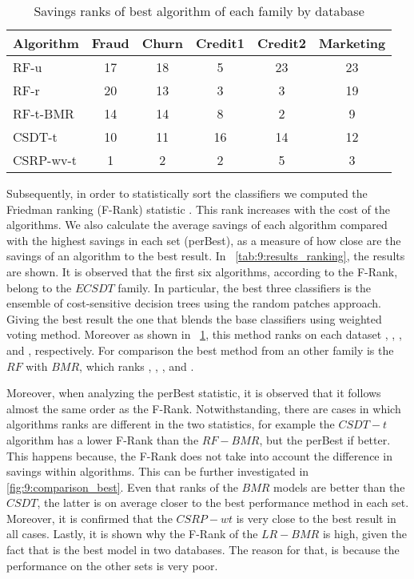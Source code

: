 {\begin{table}[!t]
  \end{table}
  \begin{table}[t]
    \centering
    \footnotesize
    \begin{tabular}{l c c c c c  } %
      \hline
      \bf{Algorithm} & \bf{Fraud} & \bf{Churn} &\bf{Credit1} & \bf{Credit2} & \bf{Marketing} \\
      \hline
      RF-u&17&18&5&23&23\\ 
      RF-r&20&13&3&3&19\\ 
      RF-t-BMR&14&14&8&2&9\\ 
      CSDT-t&10&11&16&14&12\\ 
      CSRP-wv-t&1&2&2&5&3\\ 
      \hline
    \end{tabular}
    \caption{Savings ranks of best algorithm of each family by database}
    \label{tab:9:results_best}
  \end{table}
  
  Subsequently, in order to statistically sort the classifiers we computed the Friedman ranking 
  (F-Rank)  statistic \citep{Demsar2006}. This rank increases with the cost of the algorithms. 
  We also calculate the average savings of each algorithm compared with the highest savings in 
each set (perBest), as a  measure of how close are the savings of an algorithm to the best result. 
  In \tablename{~\ref{tab:9:results_ranking}}, the results are shown. It is observed that  the 
  first six algorithms, according to the F-Rank, belong to the $ECSDT$ family. In particular, the 
  best three classifiers is the ensemble of cost-sensitive decision trees using the random patches 
  approach. Giving the best result the one that blends the base classifiers using weighted voting 
  method. Moreover as shown in  \tablename{~\ref{tab:9:results_best}}, this method ranks on each 
  dataset , , ,  and , respectively. For comparison the best 
  method from an other family is the $RF$ with $BMR$, which ranks , , , 
   and .
  
  Moreover, when analyzing the perBest statistic, it is observed that it follows almost the same 
  order as the F-Rank. Notwithstanding, there are cases in which algorithms ranks are different in 
  the two statistics, for example the $CSDT-t$ algorithm has a lower F-Rank than the $RF-BMR$, 
  but the perBest if better. This happens because, the F-Rank does not take into account the 
  difference in savings within algorithms. This can be further investigated in \figurename{ 
  \ref{fig:9:comparison_best}}. Even that ranks of the $BMR$ models are better than the $CSDT$, the 
  latter is on average closer to the best performance method in each set. Moreover, it is confirmed 
  that the $CSRP-wt$ is very close to the best result in all cases. Lastly, it is shown why the 
  F-Rank of the $LR-BMR$ is high, given the fact that is the best model in two databases. The 
  reason  for that, is because the performance on the other sets is very poor.
  
}
